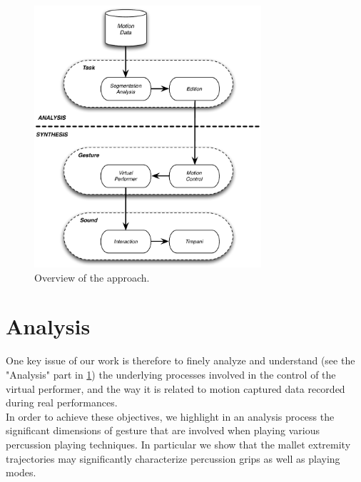 \begin{figure}%
	\begin{center}
		\includegraphics[width=0.75\textwidth]{Chapters/3/Pics/Pdf/GeneralApproach-b&w.pdf}
	\end{center}
	\vspace{-0.5cm}
	\caption[Overview of the approach]{Overview of the approach.}
	\label{fig:thesisOverview}
\end{figure}




	\section{Analysis}
	
One key issue of our work is therefore to finely analyze and understand (see the "Analysis" part in \myfigname \ref{fig:thesisOverview}) the underlying processes involved in the control of the virtual performer, and the way it is related to motion captured data recorded during real performances.\\

In order to achieve these objectives, we highlight in an analysis process the significant dimensions of gesture that are involved when playing various percussion playing techniques. In particular we show that the mallet extremity trajectories may significantly characterize percussion grips as well as playing modes.

